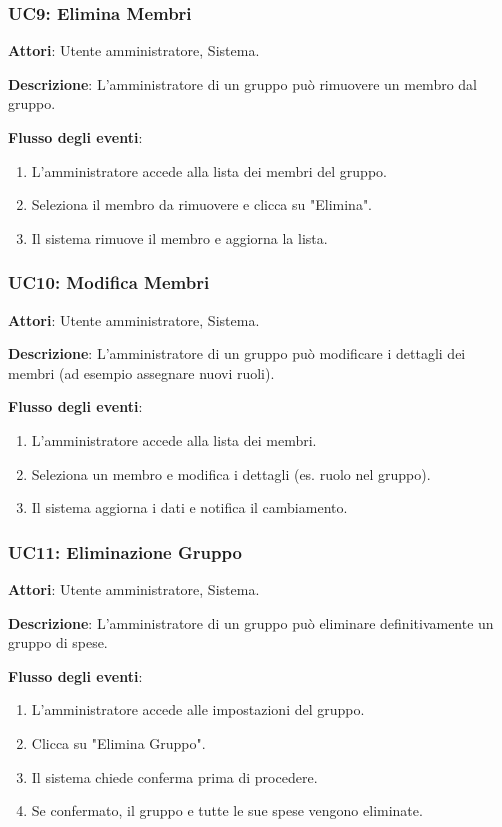 \subsubsection{UC9: Elimina Membri}
\textbf{Attori}: Utente amministratore, Sistema.

\textbf{Descrizione}: L’amministratore di un gruppo può rimuovere un membro dal gruppo.

\textbf{Flusso degli eventi}:
\begin{enumerate}
    \item L’amministratore accede alla lista dei membri del gruppo.
    \item Seleziona il membro da rimuovere e clicca su "Elimina".
    \item Il sistema rimuove il membro e aggiorna la lista.
\end{enumerate}

\subsubsection{UC10: Modifica Membri}
\textbf{Attori}: Utente amministratore, Sistema.

\textbf{Descrizione}: L’amministratore di un gruppo può modificare i dettagli dei membri (ad esempio assegnare nuovi ruoli).

\textbf{Flusso degli eventi}:
\begin{enumerate}
    \item L’amministratore accede alla lista dei membri.
    \item Seleziona un membro e modifica i dettagli (es. ruolo nel gruppo).
    \item Il sistema aggiorna i dati e notifica il cambiamento.
\end{enumerate}

\subsubsection{UC11: Eliminazione Gruppo}
\textbf{Attori}: Utente amministratore, Sistema.

\textbf{Descrizione}: L’amministratore di un gruppo può eliminare definitivamente un gruppo di spese.

\textbf{Flusso degli eventi}:
\begin{enumerate}
    \item L’amministratore accede alle impostazioni del gruppo.
    \item Clicca su "Elimina Gruppo".
    \item Il sistema chiede conferma prima di procedere.
    \item Se confermato, il gruppo e tutte le sue spese vengono eliminate.
\end{enumerate}

